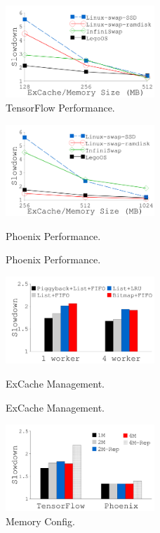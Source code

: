 {
\begin{figure}[t]
\begin{center}
\centerline{\includegraphics[width=0.5\textwidth]{lego/Figures/g_plot_LEGO_tf4.pdf}}
\caption[TensorFlow Performance.]{TensorFlow Performance.}
\label{fig-tf4}
\end{center}
\end{figure}
}
{
\begin{figure}[th]
\begin{center}
\centerline{\includegraphics[width=0.5\textwidth]{lego/Figures/g_plot_LEGO_phoenix.pdf}}
\caption{Phoenix Performance.}{Phoenix Performance.}
\label{fig-phoenix}
\end{center}
\end{figure}
}
{
\begin{figure}[th]
\begin{center}
\centerline{\includegraphics[width=0.5\textwidth]{lego/Figures/g_plot_LEGO_excache_tech.pdf}}
\caption{ExCache Management.}{ExCache Management.}
\label{fig-excache-opt}
\end{center}
\end{figure}
}
{
\begin{figure}[th]
\begin{center}
\centerline{\includegraphics[width=0.5\textwidth]{lego/Figures/g_plot_LEGO_number_memory_rep.pdf}}
\caption[Memory Config.]{Memory Config.}
\label{fig-mem-rep}
\end{center}
\end{figure}
}